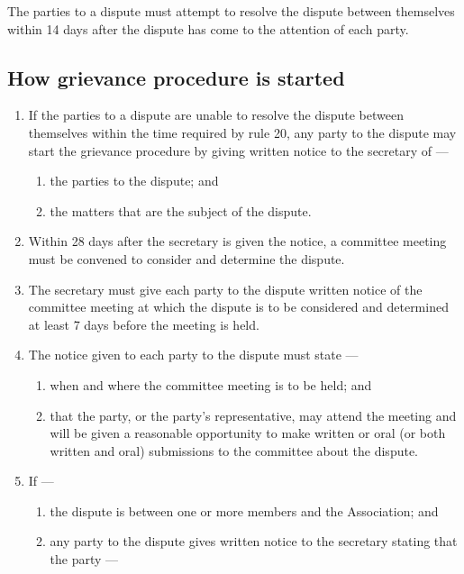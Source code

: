 \documentclass[../constitution.tex]{subfiles}
\begin{document}
The parties to a dispute must attempt to resolve the dispute between themselves within 14 days after the dispute has come to the attention of each party.

\hypertarget{how-grievance-procedure-is-started}{%
\subsection{How grievance procedure is started}\label{how-grievance-procedure-is-started}}

\begin{enumerate}

\item If the parties to a dispute are unable to resolve the dispute between themselves within the time required by rule 20, any party to the dispute may start the grievance procedure by giving written notice to the secretary of ---

  \begin{enumerate}
  
  \item the parties to the dispute; and
  \item the matters that are the subject of the dispute.
  \end{enumerate}
\item Within 28 days after the secretary is given the notice, a committee meeting must be convened to consider and determine the dispute.
\item The secretary must give each party to the dispute written notice of the committee meeting at which the dispute is to be considered and determined at least 7 days before the meeting is held.
\item The notice given to each party to the dispute must state ---

  \begin{enumerate}
  
  \item when and where the committee meeting is to be held; and
  \item that the party, or the party's representative, may attend the meeting and will be given a reasonable opportunity to make written or oral (or both written and oral) submissions to the committee about the dispute.
  \end{enumerate}
\item If ---

  \begin{enumerate}
  
  \item the dispute is between one or more members and the Association; and
  \item any party to the dispute gives written notice to the secretary stating that the party ---


\end{enumerate}
\end{enumerate}
\end{document}
